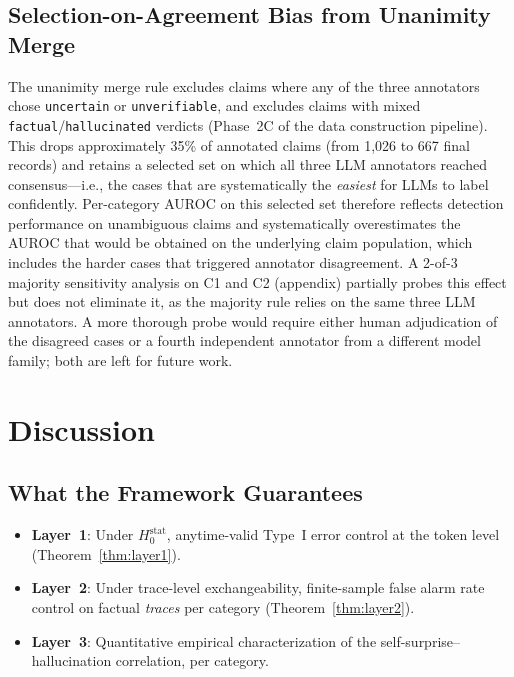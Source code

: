 \documentclass[runningheads]{llncs}
\newcommand{\Hnull}{H_0^{\text{stat}}}
\begin{document}
\subsection{Selection-on-Agreement Bias from Unanimity Merge}
\label{ssec:selection-on-agreement}

The unanimity merge rule excludes claims where any of the three
annotators chose \texttt{uncertain} or \texttt{unverifiable}, and
excludes claims with mixed \texttt{factual}/\texttt{hallucinated}
verdicts (Phase~2C of the data construction pipeline). This drops approximately
35\% of annotated claims (from 1{,}026 to 667 final records) and
retains a selected set on which all three LLM annotators reached
consensus---i.e., the cases that are systematically the
\emph{easiest} for LLMs to label confidently. Per-category AUROC on
this selected set therefore reflects detection performance on
unambiguous claims and systematically overestimates the AUROC that
would be obtained on the underlying claim population, which includes
the harder cases that triggered annotator disagreement. A 2-of-3
majority sensitivity analysis on C1 and C2 (appendix) partially
probes this effect but does not eliminate it, as the majority rule
relies on the same three LLM annotators. A more thorough probe would
require either human adjudication of the disagreed cases or a fourth
independent annotator from a different model family; both are left
for future work.

\section{Discussion}

\subsection{What the Framework Guarantees}
\begin{itemize}
    \item \textbf{Layer~1}: Under $\Hnull$, anytime-valid Type~I error control
          at the token level (Theorem~\ref{thm:layer1}).
    \item \textbf{Layer~2}: Under trace-level exchangeability,
          finite-sample false alarm rate control on factual
          \emph{traces} per category (Theorem~\ref{thm:layer2}).
    \item \textbf{Layer~3}: Quantitative empirical characterization of the
          self-surprise--hallucination correlation, per category.
\end{itemize}
\end{document}
